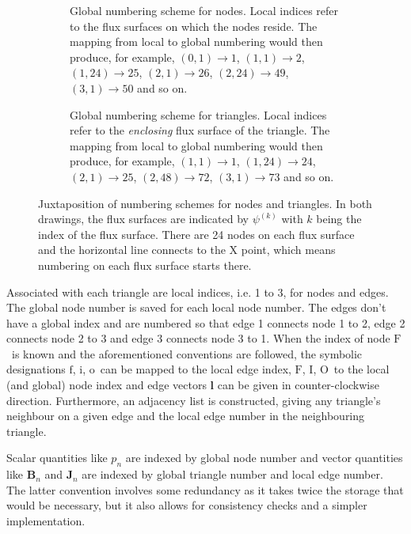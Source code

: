 \documentclass[a4paper, twoside, 10pt, english]{article}
\numberwithin{equation}{section}
\let\vec\symbf
\newcommand*\fs{\ensuremath{\textrm{f}}}  %
\newcommand*\inw{\ensuremath{\textrm{i}}}  %
\newcommand*\out{\ensuremath{\textrm{o}}}  %
\newcommand*\vfs{\ensuremath{\textrm{F}}}  %
\newcommand*\vinw{\ensuremath{\textrm{I}}}  %
\newcommand*\vout{\ensuremath{\textrm{O}}}  %
\begin{document}
\savebox{\imagebox}{}%
\begin{figure}[bth]
  \centering
  \begin{subfigure}[t]{0.48\textwidth}
    \centering
    \usebox{\imagebox}
    \caption{Global numbering scheme for nodes. Local indices refer to the flux surfaces on which the nodes reside. The mapping from local to global numbering would then produce, for example, $(0, 1) \to 1$, $(1, 1) \to 2$, $(1, 24) \to 25$, $(2, 1) \to 26$, $(2, 24) \to 49$, $(3, 1) \to 50$ and so on.}
    \label{fig:numbering_nodes}
  \end{subfigure}
  \quad
  \begin{subfigure}[t]{0.48\textwidth}
    \centering
    \raisebox{\dimexpr\ht\imagebox-\height}{}
    \caption{Global numbering scheme for triangles. Local indices refer to the \emph{enclosing} flux surface of the triangle. The mapping from local to global numbering would then produce, for example, $(1, 1) \to 1$, $(1, 24) \to 24$, $(2, 1) \to 25$, $(2, 48) \to 72$, $(3, 1) \to 73$ and so on.}
    \label{fig:numbering_triangles}
  \end{subfigure}
  \caption{Juxtaposition of numbering schemes for nodes and triangles. In both drawings, the flux surfaces are indicated by $\psi^{(k)}$ with $k$ being the index of the flux surface. There are 24 nodes on each flux surface and the horizontal line connects to the X point, which means numbering on each flux surface starts there.}
  \label{fig:numbering_scheme}
\end{figure}

Associated with each triangle are local indices, i.e. 1 to 3, for nodes and edges. The global node number is saved for each local node number. The edges don't have a global index and are numbered so that edge 1 connects node 1 to 2, edge 2 connects node 2 to 3 and edge 3 connects node 3 to 1. When the index of node \vfs\ is known and the aforementioned conventions are followed, the symbolic designations \fs, \inw, \out\ can be mapped to the local edge index, \vfs, \vinw, \vout\ to the local (and global) node index and edge vectors $\vec{l}$ can be given in counter-clockwise direction. Furthermore, an adjacency list is constructed, giving any triangle's neighbour on a given edge and the local edge number in the neighbouring triangle.

Scalar quantities like $p_{n}$ are indexed by global node number and vector quantities like $\vec{B}_{n}$ and $\vec{J}_{n}$ are indexed by global triangle number and local edge number. The latter convention involves some redundancy as it takes twice the storage that would be necessary, but it also allows for consistency checks and a simpler implementation.
\end{document}
